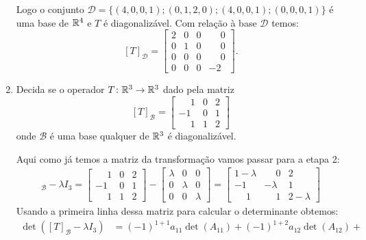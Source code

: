 \begin{exemplo}
\begin{enumerate}[label={\arabic*})]
\begin{solucao}
                Logo o conjunto $\mathcal{D} = \{(4, 0, 0, 1); (0, 1, 2, 0); (4, 0, 0, 1); (0, 0, 0, 1)\}$ é uma base de $\mathbb{R}^4$ e $T$
                é diagonalizável. Com relação à base $\mathcal{D}$ temos:
                \[
                    [T]_\mathcal{D} = \begin{bmatrix}2 & 0 & 0 & \phantom{-}0\\0 & 1 & 0 & \phantom{-}0\\0 & 0 & 0 & \phantom{-}0\\
                    0 & 0 & 0 & -2\end{bmatrix}.
                \]
            \end{solucao}

        \item Decida se o operador $T \colon \mathbb{R}^3 \to \mathbb{R}^3$ dado pela matriz
            \[
                [T]_\mathcal{B} = \begin{bmatrix}\phantom{-}1 & 0 & 2\\-1 & 0 & 1\\\phantom{-}1 & 1 & 2\end{bmatrix}
            \]
            onde $\mathcal{B}$ é uma base qualquer de $\mathbb{R}^3$ é diagonalizável.
            \begin{solucao}
                Aqui como já temos a matriz da transformação vamos passar para a etapa 2:
                \begin{align*}
                    [T]_\mathcal{B} - \lambda I_3 = \begin{bmatrix}\phantom{-}1 & 0 & 2\\-1 & 0 & 1\\\phantom{-}1 & 1 & 2\end{bmatrix} -
                    \begin{bmatrix} \lambda & 0 & 0\\0 & \lambda & 0\\0 & 0 & \lambda\end{bmatrix} = \begin{bmatrix}1 - \lambda &
                \phantom{-}0 & 2\\-1 & -\lambda & 1\\\phantom{-}1 & \phantom{-}1 &2 - \lambda\end{bmatrix}
                \end{align*}
                Usando a primeira linha dessa matriz para calcular o determinante obtemos:
                \begin{align*}
                    \det([T]_\mathcal{B} - \lambda I_3) &= (-1)^{1 + 1}a_{11}\det(A_{11}) + (-1)^{1 + 2}a_{12}\det(A_{12}) +

\end{align*}
\end{solucao}
\end{enumerate}
\end{exemplo}
